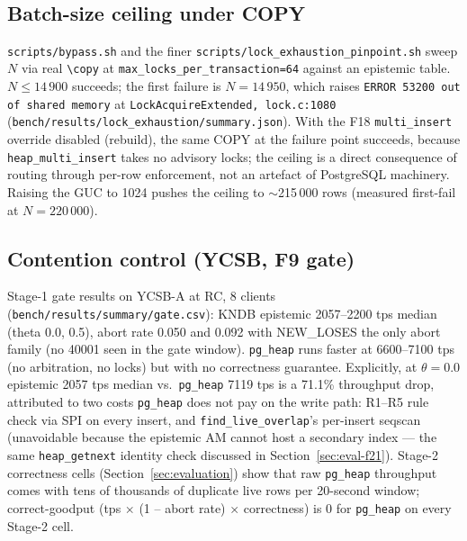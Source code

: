 \documentclass[sigconf, nonacm]{acmart}
\begin{document}
\begin{table}[t]
\begin{tabular}{p{4.7cm}cc}
\bottomrule
\end{tabular}\\[2pt]
\end{table}

\subsection{Batch-size ceiling under COPY}
\texttt{scripts/bypass.sh} and the finer \texttt{scripts/lock\_exhaustion\_pinpoint.sh} sweep $N$ via real \texttt{\textbackslash copy} at \texttt{max\_locks\_per\_transaction=64} against an epistemic table. $N \le 14\,900$ succeeds; the first failure is $N=14\,950$, which raises \texttt{ERROR 53200 out of shared memory} at \texttt{LockAcquireExtended, lock.c:1080} (\texttt{bench/results/lock\_exhaustion/summary.json}). With the F18 \texttt{multi\_insert} override disabled (rebuild), the same COPY at the failure point succeeds, because \texttt{heap\_multi\_insert} takes no advisory locks; the ceiling is a direct consequence of routing through per-row enforcement, not an artefact of PostgreSQL machinery. Raising the GUC to 1024 pushes the ceiling to $\sim$215\,000 rows (measured first-fail at $N=220\,000$).

\subsection{Contention control (YCSB, F9 gate)}
\label{sec:eval-f9-gate}
Stage-1 gate results on YCSB-A at RC, 8 clients (\texttt{bench/results/summary/gate.csv}): KNDB epistemic 2057--2200 tps median (theta 0.0, 0.5), abort rate 0.050 and 0.092 with NEW\_LOSES the only abort family (no 40001 seen in the gate window). \texttt{pg\_heap} runs faster at 6600--7100 tps (no arbitration, no locks) but with no correctness guarantee. Explicitly, at $\theta=0.0$ epistemic 2057 tps median vs.\ \texttt{pg\_heap} 7119 tps is a 71.1\% throughput drop, attributed to two costs \texttt{pg\_heap} does not pay on the write path: R1--R5 rule check via SPI on every insert, and \texttt{find\_live\_overlap}'s per-insert seqscan (unavoidable because the epistemic AM cannot host a secondary index — the same \texttt{heap\_getnext} identity check discussed in Section~\ref{sec:eval-f21}). Stage-2 correctness cells (Section~\ref{sec:evaluation}) show that raw \texttt{pg\_heap} throughput comes with tens of thousands of duplicate live rows per 20-second window; correct-goodput (tps $\times$ (1 -- abort rate) $\times$ correctness) is 0 for \texttt{pg\_heap} on every Stage-2 cell.
\end{document}
